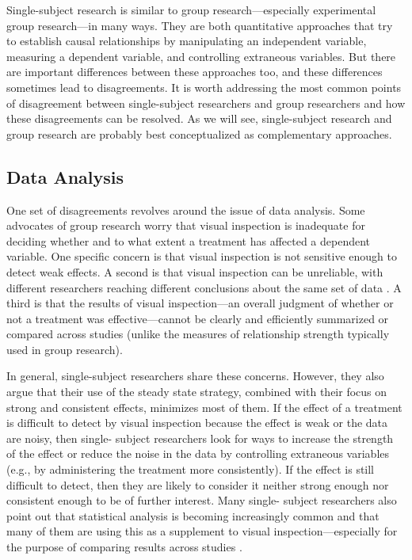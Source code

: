  Single-subject research is similar to group research---especially experimental group research---in many ways. They are both quantitative approaches that try to establish causal relationships by manipulating an independent variable, measuring a dependent variable, and controlling extraneous variables. But there are important differences between these approaches too, and these differences sometimes lead to disagreements. It is worth addressing the most common points of disagreement between single-subject researchers and group researchers and how these disagreements can be resolved. As we will see, single-subject research and group research are probably best conceptualized as complementary approaches.
 
 \subsection{Data Analysis}
 
 One set of disagreements revolves around the issue of data analysis. Some advocates of group research worry that visual inspection is inadequate for deciding whether and to what extent a treatment has affected a dependent variable. One specific concern is that visual inspection is not sensitive enough to detect weak effects. A second is that visual inspection can be unreliable, with different researchers reaching different conclusions about the same set of data \citep{danov_survey_2008}. A third is that the results of visual inspection---an overall judgment of whether or not a treatment was effective---cannot be clearly and efficiently summarized or compared across studies (unlike the measures of relationship strength typically used in group research).
 
 In general, single-subject researchers share these concerns. However, they also argue that their use of the steady state strategy, combined with their focus on strong and consistent effects, minimizes most of them. If the effect of a treatment is difficult to detect by visual inspection because the effect is weak or the data are noisy, then single- subject researchers look for ways to increase the strength of the effect or reduce the noise in the data by controlling extraneous variables (e.g., by administering the treatment more consistently). If the effect is still difficult to detect, then they are likely to consider it neither strong enough nor consistent enough to be of further interest. Many single- subject researchers also point out that statistical analysis is becoming increasingly common and that many of them are using this as a supplement to visual inspection---especially for the purpose of comparing results across studies \citep{scruggs_how_2001}.
 
